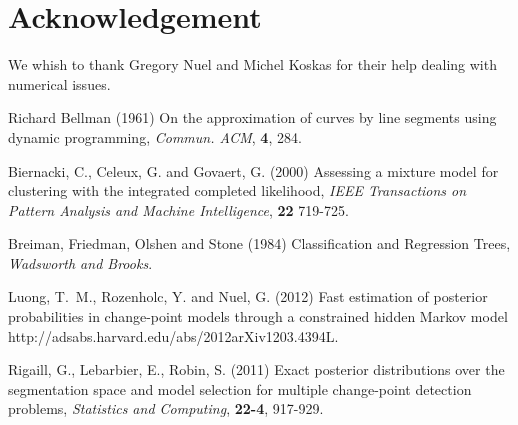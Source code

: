 \documentclass{bioinfo}
\begin{document}
\section*{Acknowledgement}
We whish to thank Gregory Nuel and Michel Koskas for their help dealing with numerical issues.


%
%
%
%
%
%
%
%
%


\begin{thebibliography}{}

 Richard Bellman (1961) On the approximation of curves by line segments using dynamic programming,  {\it Commun. {ACM}}, {\bf 4}, 284.

 Biernacki, C., Celeux, G. and Govaert, G. (2000) Assessing a mixture model for clustering with the integrated completed likelihood, {\it{IEEE} Transactions on Pattern Analysis and Machine Intelligence}, {\bf 22} 719-725.

 Breiman, Friedman, Olshen and Stone (1984) Classification and Regression Trees, {\it Wadsworth and Brooks}.

 Luong, T.~M., Rozenholc, Y. and Nuel, G. (2012) Fast estimation of posterior probabilities in change-point models through a constrained hidden Markov model {http://adsabs.harvard.edu/abs/2012arXiv1203.4394L}.

 Rigaill, G., Lebarbier, E., Robin, S. (2011) Exact posterior distributions over the segmentation space and model selection for multiple change-point detection problems, {\it Statistics and Computing}, {\bf 22-4}, 917-929.

\end{thebibliography}
\end{document}

